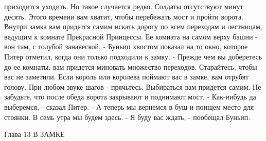 приходится уходить. Но такое случается редко.
    Солдаты отсутствуют минут десять. Этого времени вам хватит, чтобы 
перебежать мост и пройти ворота. Внутри замка вам придется самим 
искать дорогу по всем переходам и лестницам, ведущим к комнате 
Прекрасной Принцессы.
    Ее комната на самом верху башни - вон там, с голубой занавеской, - 
Буньип хвостом показал на то окно, которое Питер отметил, когда они 
только подходили к замку.
    - Прежде чем вы доберетесь до ее комнаты. вам придется миновать 
множество переходов. Старайтесь, чтобы вас не заметили. Если король 
или королева поймают вас в замке, вам отрубят голову. При любом звуке 
шагов - прячьтесь. Выбираться вам придется самим. Не забудьте, что 
после обеда ворота закрывают и поднимают мост.
    - Как-нибудь да выберемся, - сказал Питер. - А теперь мы вернемся 
в буш и поищем место для стоянки. В семь утра мы будем здесь.
    - Я буду вас ждать, - пообещал Буньип.

        Глава 13
        В ЗАМКЕ

